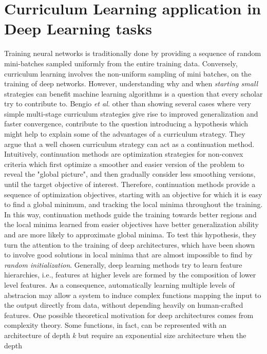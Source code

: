 \section{Curriculum Learning application in Deep Learning tasks}
Training neural networks is traditionally done by providing a sequence of 
random mini-batches sampled uniformly from the entire training data. Conversely, curriculum learning
involves the non-uniform sampling of mini batches, on the training of deep networks.
However, understanding why and when \textit{starting small} strategies can 
benefit machine learning algorithms is a question that every scholar try to contribute to.
Bengio \textit{et al.} \cite{bengio2009curriculum} other than showing several cases where very simple
multi-stage curriculum strategies give rise to improved generalization and faster convergence, 
contribute to the question introducing a hypothesis which might help to explain 
some of the advantages of a curriculum strategy. They argue that a well chosen curriculum 
strategy can act as a continuation method. Intuitively, continuation methods are optimization
strategies for non-convex criteria which first optimize a smoother and easier version of the problem to 
reveal the "global picture", and then gradually consider less smoothing versions, until the target objective of 
interest. Therefore, continuation methods provide a sequence of optimization objectives, starting with an objective for which
it is easy to find a global minimum, and tracking the local minima throughout the training. In this way, continuation methods
guide the training towards better regions  and the local minima learned from easier objectives have better
generalization ability and are more likely to approximate global minima.
To test this hypothesis, they turn the attention to the training of deep
architectures, which have been shown to involve good solutions in local minima that are almost impossible to find 
by \textit{random initialization}. Generally, deep learning methods try 
to learn feature hierarchies, i.e., features at higher levels are formed by the composition of lower level features.
As a consequence, automatically learning multiple levels of abstracion may allow a system to induce complex functions mapping the input to the 
output directly from data, without depending heavily on human-crafted features.
One possible theoretical motivation for deep architectures comes from complexity theory. Some functions, in fact, can 
be represented with an architecture of depth \textit{k} but require an exponential size architecture when the depth 
